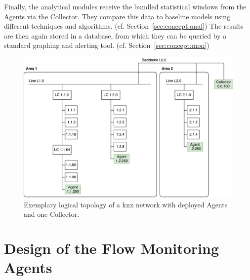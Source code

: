Finally, the analytical modules receive the bundled statistical windows from the Agents via the Collector. They compare this data to baseline models using different techniques and algorithms. (cf. Section~\ref{sec:concept:anal})
The results are then again stored in a database, from which they can be queried by a standard graphing and alerting tool. (cf. Section~\ref{sec:concept:mon})

\begin{figure}
	\centering
	\includegraphics[width=\textwidth]{figures/500-knx-demo-topo-with-agents.pdf}
	\caption[KNX network topology with Agents and Collector]{Exemplary logical topology of a \gls{knx} network with deployed Agents and one Collector.}
	\label{fig:concept:network}
\end{figure}

\section{Design of the Flow Monitoring Agents}
\label{sec:concept:agent}

